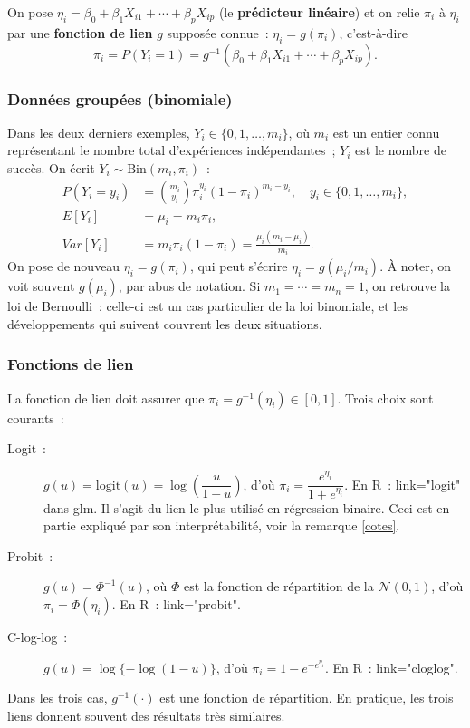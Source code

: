 \documentclass[11pt,letterpaper]{article}
\begin{document}
On pose $\eta_i = \beta_0 + \beta_1 X_{i1} + \cdots + \beta_p X_{ip}$ (le \textbf{prédicteur linéaire}) et on relie $\pi_i$ à $\eta_i$ par une \textbf{fonction de lien} $g$ supposée connue~: $\eta_i = g(\pi_i)$, c'est-à-dire
$$\pi_i = P(Y_i = 1) = g^{-1}(\beta_0 + \beta_1 X_{i1} + \cdots + \beta_p X_{ip}).$$

\subsubsection{Données groupées (binomiale)}

Dans les deux derniers exemples, $Y_i \in \{0,1,\ldots,m_i\}$, où $m_i$ est un entier connu représentant le nombre total d'expériences indépendantes~; $Y_i$ est le nombre de succès. On écrit $Y_i \sim \mathrm{Bin}(m_i,\pi_i)$~:
\begin{align*}
P(Y_i = y_i) &= \binom{m_i}{y_i}\pi_i^{y_i}(1-\pi_i)^{m_i - y_i}, \quad y_i \in \{0,1,\ldots,m_i\},\\
E[Y_i] &= \mu_i = m_i\pi_i,\\
Var[Y_i] &= m_i\pi_i(1-\pi_i) = \frac{\mu_i(m_i - \mu_i)}{m_i}.
\end{align*}
On pose de nouveau $\eta_i = g(\pi_i)$, qui peut s'écrire $\eta_i=g(\mu_i/m_i)$. À noter, on voit souvent $g(\mu_i)$, par abus de notation. Si $m_1 = \cdots = m_n = 1$, on retrouve la loi de Bernoulli~: celle-ci est un cas particulier de la loi binomiale, et les développements qui suivent couvrent les deux situations.

\subsubsection{Fonctions de lien}

La fonction de lien doit assurer que $\pi_i = g^{-1}(\eta_i) \in [0,1]$. Trois choix sont courants~:
\begin{description}
\item[Logit~:] $g(u) = \mathrm{logit}(u) = \log\!\left(\dfrac{u}{1-u}\right)$, d'où $\pi_i = \dfrac{e^{\eta_i}}{1+e^{\eta_i}}$. En \textrm{R}~: \textsf{link="logit"} dans \textsf{glm}. Il s'agit du lien le plus utilisé en régression binaire. Ceci est en partie expliqué par son interprétabilité, voir la remarque \ref{cotes}.
\item[Probit~:] $g(u) = \Phi^{-1}(u)$, où $\Phi$ est la fonction de répartition de la $\mathcal{N}(0,1)$, d'où $\pi_i = \Phi(\eta_i)$. En \textrm{R}~: \textsf{link="probit"}.
\item[C-log-log~:] $g(u) = \log\{-\log(1-u)\}$, d'où $\pi_i = 1 - e^{-e^{\eta_i}}$. En \textrm{R}~: \textsf{link="cloglog"}.
\end{description}
Dans les trois cas, $g^{-1}(\cdot)$ est une fonction de répartition. En pratique, les trois liens donnent souvent des résultats très similaires.
\end{document}
